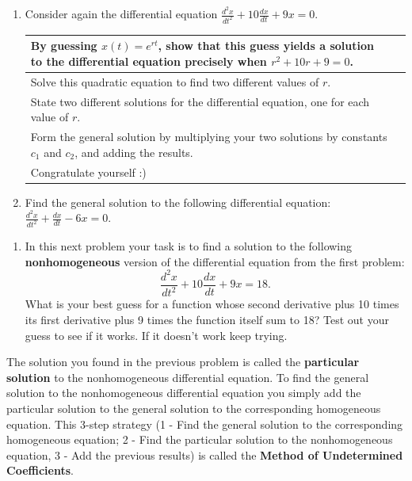 \begin{enumerate}
\clearpage

\item Consider again the differential equation $\displaystyle\frac{d^2x}{dt^2}+10\frac{dx}{dt}+9x=0$. \label{13problem6}

\begin{tabular}{|p{2.5in}|p{3in}|}
\hline
By guessing $x(t) = e^{rt}$, show that this guess yields a solution to the differential equation precisely when $r^2 + 10r + 9 = 0$. \vspace{2.25in} &  \\ \hline
Solve this quadratic equation to find two different values of $r$. \vspace{1.25in} &  \\ \hline
State two different solutions for the differential equation, one for each value of $r$. &  \\ \hline
Form the general solution by multiplying your two solutions by constants $c_1$ and $c_2$, and adding the results. &  \\ \hline
Congratulate yourself :) &  \\ \hline
\end{tabular}

\item Find the general solution to the following differential equation: $\displaystyle\frac{d^2x}{dt^2}+\frac{dx}{dt}-6x=0$. \label{13problem7}
\end{enumerate}
\clearpage
{}
\begin{enumerate}[resume]
\item In this next problem your task is to find a solution to the following \textbf{nonhomogeneous} version of the differential equation from the first problem:
\[
\frac{d^2x}{dt^2}+10\frac{dx}{dt}+9x=18.
\]
What is your best guess for a function whose second derivative plus 10 times its first derivative plus 9 times the function itself sum to 18? Test out your guess to see if it works. If it doesn't work keep trying. \label{13problem8}
\end{enumerate}
\clearpage

The solution you found in the previous problem is called the \textbf{particular solution} to the nonhomogeneous differential equation. To find the general solution to the nonhomogeneous differential equation you simply add the particular solution to the general solution to the corresponding homogeneous equation. This 3-step strategy (1 - Find the general solution to the corresponding homogeneous equation; 2 - Find the particular solution to the nonhomogeneous equation, 3 - Add the previous results) is called the \textbf{Method of Undetermined Coefficients}.

